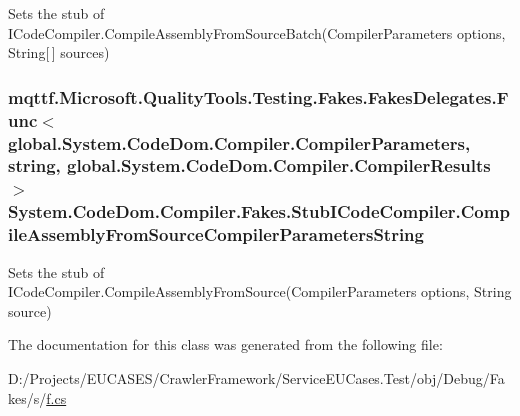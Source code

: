 Sets the stub of I\-Code\-Compiler.\-Compile\-Assembly\-From\-Source\-Batch(\-Compiler\-Parameters options, String\mbox{[}$\,$\mbox{]} sources)

\hypertarget{class_system_1_1_code_dom_1_1_compiler_1_1_fakes_1_1_stub_i_code_compiler_a8352ee9a3cfd19014b0433f42b92d130}{
\subsubsection[{Compile\-Assembly\-From\-Source\-Compiler\-Parameters\-String}]{\setlength{\rightskip}{0pt plus 5cm}mqttf.\-Microsoft.\-Quality\-Tools.\-Testing.\-Fakes.\-Fakes\-Delegates.\-Func$<$global.\-System.\-Code\-Dom.\-Compiler.\-Compiler\-Parameters, string, global.\-System.\-Code\-Dom.\-Compiler.\-Compiler\-Results$>$ System.\-Code\-Dom.\-Compiler.\-Fakes.\-Stub\-I\-Code\-Compiler.\-Compile\-Assembly\-From\-Source\-Compiler\-Parameters\-String}}\label{class_system_1_1_code_dom_1_1_compiler_1_1_fakes_1_1_stub_i_code_compiler_a8352ee9a3cfd19014b0433f42b92d130}


Sets the stub of I\-Code\-Compiler.\-Compile\-Assembly\-From\-Source(\-Compiler\-Parameters options, String source)



The documentation for this class was generated from the following file\-:\begin{DoxyCompactItemize}
\item 
D\-:/\-Projects/\-E\-U\-C\-A\-S\-E\-S/\-Crawler\-Framework/\-Service\-E\-U\-Cases.\-Test/obj/\-Debug/\-Fakes/s/\hyperlink{s_2f_8cs}{f.\-cs}\end{DoxyCompactItemize}
